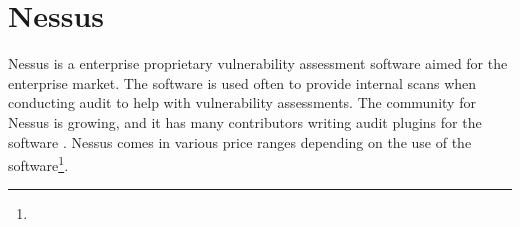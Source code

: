 \newpage
\section{Nessus}
\label{s:HowNessusWorks}
Nessus is a enterprise proprietary vulnerability assessment software aimed for the enterprise market.
The software is used often to provide internal scans when conducting audit to help with vulnerability assessments. The community for Nessus is growing, and it has many contributors writing audit plugins for the software \autocite{rogers2011nessus}. Nessus comes in various price ranges depending on the use of the software\footnote{}.
